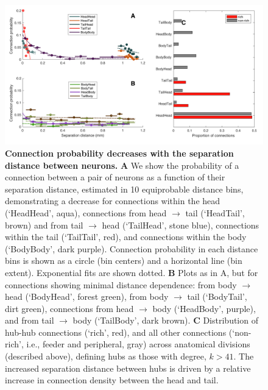 \documentclass[10pt,letterpaper]{article}
\begin{document}

\begin{figure}[h]
\centering
    \includegraphics[width=1\textwidth]{ConnectionProbability.pdf}
\caption{
\label{fig:S_connProbability}
\textbf{Connection probability decreases with the separation distance between neurons.}
\textbf{A}
We show the probability of a connection between a pair of neurons as a function of their separation distance, estimated in 10 equiprobable distance bins, demonstrating a decrease for connections within the head (`HeadHead', aqua), connections from head $\rightarrow$ tail (`HeadTail', brown) and from tail $\rightarrow$ head (`TailHead', stone blue), connections within the tail (`TailTail', red), and connections within the body (`BodyBody', dark purple).
Connection probability in each distance bins is shown as a circle (bin centers) and a horizontal line (bin extent).
Exponential fits are shown dotted.
\textbf{B}
Plots as in A, but for connections showing minimal distance dependence: from body $\rightarrow$ head (`BodyHead', forest green), from body $\rightarrow$ tail (`BodyTail', dirt green), connections from head $\rightarrow$ body (`HeadBody', purple), and from tail $\rightarrow$ body (`TailBody', dark brown).
\textbf{C}
Distribution of hub-hub connections (`rich', red), and all other connections (`non-rich', i.e., feeder and peripheral, gray) across anatomical divisions (described above), defining hubs as those with degree, $k > 41$.
The increased separation distance between hubs is driven by a relative increase in connection density between the head and tail.
}
\end{figure}
\end{document}
